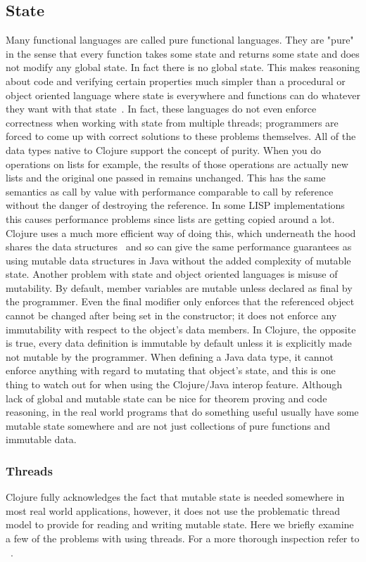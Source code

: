 \subsection{State}
Many functional languages are called pure functional languages. 
They are "pure" in the sense that every function takes some state and
returns some state and does not modify any global state. 
In fact there is no global state. 
This makes reasoning about code and verifying certain properties much
simpler than a procedural or object oriented language where state is
everywhere and functions can do whatever they want with that
state~\cite{process}. 
In fact, these languages do not even enforce correctness when working
with state from multiple threads; programmers are forced to come up
with correct solutions to these problems themselves.
 All of the data types native to Clojure support the concept of
 purity. 
When you do operations on lists for example, the results of
 those operations are actually new lists and the original one passed
 in remains unchanged. 
This has the same semantics as call by value with performance
comparable to call by reference without the danger of destroying the
reference. 
In some LISP implementations this causes performance problems
since lists are getting copied around a lot. 
Clojure uses a much more efficient way of doing this, which underneath the hood shares the data
structures~\cite{cljDataStructures} and so can give the same
performance guarantees as using mutable data structures in Java
without the added complexity of mutable state. 
Another problem with state and object oriented languages is misuse of
mutability. 
By default, member variables are mutable unless declared as final by
the programmer. 
Even the final modifier only enforces that the referenced object
cannot be changed after being set in the constructor; it does not
enforce any immutability with respect to the object's data members. 
In Clojure, the opposite is true, every data definition is immutable
by default unless it is explicitly made not mutable by the
programmer. 
When defining a Java data type, it cannot enforce anything with regard
to mutating that object's state, and this is one thing to watch out
for when using the Clojure/Java interop feature. 
Although lack of global and mutable state can be nice for theorem proving and code reasoning, in the real world programs that do something useful usually have some mutable state somewhere and are not just collections of pure functions and immutable data.  

\subsubsection{Threads}
Clojure fully acknowledges the fact that mutable state is needed
somewhere in most real world applications, however, it does not use
the problematic thread model to provide for reading and writing
mutable state. 
Here we briefly examine a few of the problems with using threads. 
For a more thorough inspection refer to ~\cite{1076522}.

